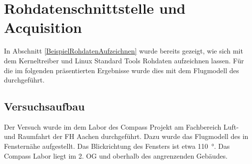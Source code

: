 \section{Rohdatenschnittstelle und Acquisition}
In Abschnitt \ref{BeispielRohdatenAufzeichnen} wurde bereits gezeigt, wie sich mit dem Kerneltreiber und Linux Standard Tools Rohdaten aufzeichnen lassen. Für die im folgenden präsentierten Ergebnisse wurde dies mit dem Flugmodell des \dscubesat durchgeführt.

\subsection{Versuchsaufbau}
Der Versuch wurde im dem Labor des Compass Projekt am Fachbereich Luft- und Raumfahrt der FH Aachen durchgeführt. Dazu wurde das Flugmodell des \dscubesat in Fensternähe aufgestellt. Das Blickrichtung des Fensters ist etwa \SI{110}{\degree}. Das Compass Labor liegt im 2. OG und oberhalb des angrenzenden Gebäudes. 